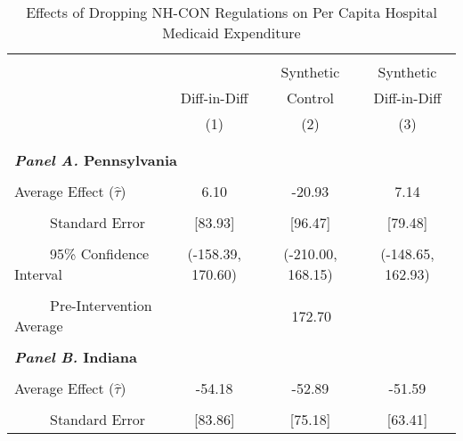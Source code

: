 \documentclass[12pt]{article}
\begin{document}
\null
\vfill
\begin{table}[htbp]\centering \footnotesize
\def\sym#1{\ifmmode^{#1}\else\(^{#1}\)\fi}
\captionsetup{width=.8\textwidth}
\caption{\centering Effects of Dropping NH-CON Regulations on Per Capita Hospital Medicaid Expenditure}
\label{tab:ave_results_med_hos_exp_nobord_nocon}
\setlength{\tabcolsep}{10pt}
\begin{tabular}{l*{3}{c}}
\hline\hline
\\[-2ex]
&\multicolumn{1}{c}{}&\multicolumn{1}{c}{Synthetic}&\multicolumn{1}{c}{Synthetic}\\
&\multicolumn{1}{c}{Diff-in-Diff}&\multicolumn{1}{c}{Control}&\multicolumn{1}{c}{Diff-in-Diff}\\
&\multicolumn{1}{c}{(1)}&\multicolumn{1}{c}{(2)}&\multicolumn{1}{c}{(3)}\\
\\[-2ex]
\hline
\\[-.1ex]
\multicolumn{4}{l}{\textbf{\textit{Panel A.} Pennsylvania}}\\
\\[-1.5ex]
\multicolumn{1}{l}{Average Effect ($\hat{\tau}$)}&   \multicolumn{1}{c}{6.10}&   \multicolumn{1}{c}{-20.93}&  \multicolumn{1}{c}{7.14}\\
\\[-2ex]
\multicolumn{1}{l}{\ \ \ \ \ Standard Error}  &\multicolumn{1}{c}{[83.93]}&\multicolumn{1}{c}{[96.47]}&\multicolumn{1}{c}{[79.48]}\\
\\[-2ex]
\multicolumn{1}{l}{\ \ \ \ \ 95\% Confidence Interval}&   \multicolumn{1}{c}{(-158.39, 170.60)}&   \multicolumn{1}{c}{(-210.00, 168.15)}&   \multicolumn{1}{c}{(-148.65, 162.93)}\\
\\[-2ex]
\multicolumn{1}{l}{\ \ \ \ \ Pre-Intervention Average}&   \multicolumn{3}{c}{172.70}\\
\\[-.1ex]
\multicolumn{4}{l}{\textbf{\textit{Panel B.} Indiana}}\\
\\[-1.5ex]
\multicolumn{1}{l}{Average Effect ($\hat{\tau}$)}&   \multicolumn{1}{c}{-54.18}&   \multicolumn{1}{c}{-52.89}&  \multicolumn{1}{c}{-51.59}\\
\\[-2ex]
\multicolumn{1}{l}{\ \ \ \ \ Standard Error}  &\multicolumn{1}{c}{[83.86]}&\multicolumn{1}{c}{[75.18]}&\multicolumn{1}{c}{[63.41]}\\

\end{tabular}
\end{table}
\end{document}
